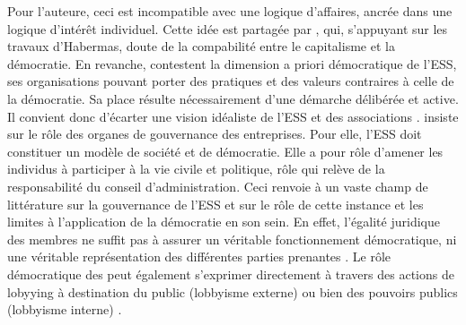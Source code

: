             Pour l’auteure, ceci est incompatible avec une logique d’affaires, ancrée dans une logique d’intérêt individuel. Cette idée est partagée par \textcite{laville2011agir}, qui, s'appuyant sur les travaux d'Habermas, doute de la compabilité entre le capitalisme et la démocratie.
            En revanche, \textcite{dodge2016nonprofits} contestent la dimension a priori démocratique de l’ESS, ses organisations pouvant porter des pratiques et des valeurs contraires à celle de la démocratie. Sa place  résulte nécessairement d’une démarche délibérée et active. Il convient donc d’écarter une vision idéaliste de l’ESS et des associations \parencite[][p. 26]{laville2016economie}. \textcite{mccambridge2004underestimating} insiste sur le rôle des organes de gouvernance des entreprises. Pour elle, l’ESS doit constituer un modèle de société et de démocratie. Elle a pour rôle d’amener les individus à participer à la vie civile et politique, rôle qui relève de la responsabilité du conseil d’administration. Ceci renvoie à un vaste champ de littérature sur la gouvernance de l’ESS et sur le rôle de cette instance \parencite{brown2010exploring, chait2005governance, collette2009economie, cornforth2004gouvernance, cornforth2012nonprofit, ostrower2006governance:, harrison2012perceptions}
             et les limites à l’application de la démocratie en son sein. En effet, l’égalité juridique des membres ne suffit pas à assurer un véritable fonctionnement démocratique, ni une véritable représentation des différentes parties prenantes \parencite[][p. 318]{laville2016economie}. Le rôle démocratique des \oess peut également s'exprimer directement à travers des actions de lobyying à destination du public (lobbyisme externe) ou bien des pouvoirs publics (lobbyisme interne) \parencite{junk2016two}. \\

